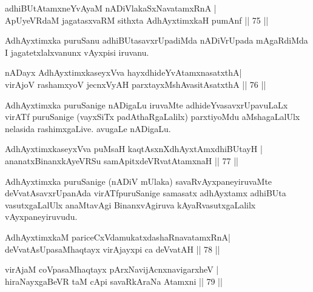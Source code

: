 \begin{shl}
adhiBUtAtamxneYvAyaM nADiVlakaSxNavatamxRnA |\\
ApUyeVRdaM jagatasxvaRM sithxta AdhAyxtimxkaH pumAnf \hfill || 75 || 
\end{shl}

\begin{artha}
AdhAyxtimxka puruSanu adhiBUtasavxrUpadiMda nADiVrUpada mAgaRdiMda I jagatetxlalxvanunx vAyxpisi iruvanu.
\end{artha}


\begin{shl}
nADayx AdhAyxtimxkaseyxVva hayxdhideYvAtamxnasatxthA|\\
virAjoV rashamxyoV jecnxVyAH parxtayxMshAvasitAsatxthA \hfill || 76 || 
\end{shl}

\begin{artha}
AdhAyxtimxka puruSanige nADigaLu iruvaMte adhideYvasavxrUpavuLaLx virATf puruSanige (vayxSiTx padAthaRgaLalilx) parxtiyoMdu aMshagaLalUlx nelasida rashimxgaLive. avugaLe nADigaLu.
\end{artha}

\begin{shl}
AdhAyxtimxkaseyxVva puMsaH kaqtAsxnX\s dhAyxtAmxdhiBUtayH |\\
ananatxBinanxkAyeVRSu samApitxdeVRvatAtamxnaH \hfill || 77 || 
\end{shl}

\begin{artha}
AdhAyxtimxka puruSanige (nADiV mUlaka) savaRvAyxpaneyiruvaMte deVvatAsavxrUpanAda virATfpuruSanige samasatx adhAyxtamx adhiBUta vasutxgaLalUlx anaMtavAgi BinanxvAgiruva kAyaRvasutxgaLalilx vAyxpaneyiruvudu.
\end{artha}


\begin{shl}
AdhAyxtimxkaM pariceCxVdamukatxdashaRnavatamxRnA|\\
deVvatAsUpasaMhaqtayx virAjayxpi ca deVvatAH \hfill || 78 || 
\end{shl}

\begin{shl}
virAjaM coVpasaMhaqtayx pArxNavijAcnxnavigarxheV |\\
hiraNayxgaBeVR taM cApi savaRkAraNa Atamxni \hfill || 79 || 
\end{shl}

